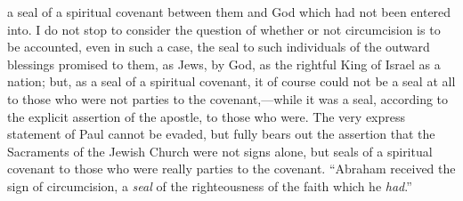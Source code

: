 \documentclass[english,]{book}
\begin{document}
a seal of a spiritual covenant between them and God which had not been entered into. I do not stop to consider the question of whether or not circumcision is to be accounted, even in such a case, the seal to such individuals of the outward blessings promised to them, as Jews, by God, as the rightful King of Israel as a nation; but, as a seal of a spiritual covenant, it of course could not be a seal at all to those who were not parties to the covenant,---while it was a seal, according to the explicit assertion of the apostle, to those who were. The very express statement of Paul cannot be evaded, but fully bears out the assertion that the Sacraments of the Jewish Church were not signs alone, but seals of a spiritual covenant to those who were really parties to the covenant. ``Abraham received the sign of circumcision, a \emph{seal} of the righteousness of the faith which he \emph{had}.''
\end{document}
